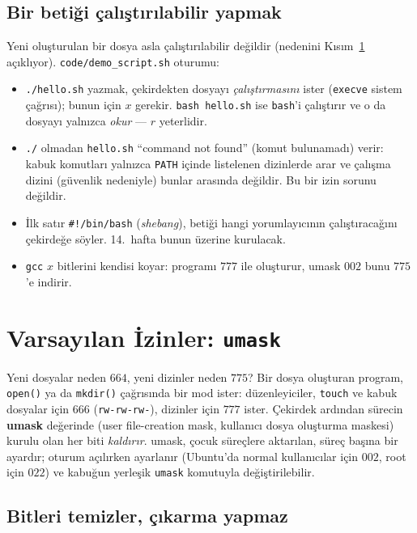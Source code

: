 \documentclass[11pt,a4paper]{article}
\newcommand{\term}[1]{\textbf{\color{mintdeep}#1}}
\newcommand{\cmd}[1]{\texttt{#1}}
\begin{document}
\subsection{Bir betiği çalıştırılabilir yapmak}
\label{sec:script}

Yeni oluşturulan bir dosya asla çalıştırılabilir değildir (nedenini Kısım~\ref{sec:umask} açıklıyor). \cmd{code/demo\_script.sh} oturumu:



\begin{itemize}
  \item \cmd{./hello.sh} yazmak, çekirdekten dosyayı \emph{çalıştırmasını} ister (\cmd{execve} sistem çağrısı); bunun için $x$ gerekir. \cmd{bash hello.sh} ise \cmd{bash}'i çalıştırır ve o da dosyayı yalnızca \emph{okur} --- $r$ yeterlidir.
  \item \texttt{./} olmadan \cmd{hello.sh} ``command not found'' (komut bulunamadı) verir: kabuk komutları yalnızca \texttt{PATH} içinde listelenen dizinlerde arar ve çalışma dizini (güvenlik nedeniyle) bunlar arasında değildir. Bu bir izin sorunu değildir.
  \item İlk satır \texttt{\#!/bin/bash} (\emph{shebang}), betiği hangi yorumlayıcının çalıştıracağını çekirdeğe söyler. 14.~hafta bunun üzerine kurulacak.
  \item \cmd{gcc} $x$ bitlerini kendisi koyar: programı $777$ ile oluşturur, umask $002$ bunu $775$'e indirir.
\end{itemize}

\section{Varsayılan İzinler: \cmd{umask}}
\label{sec:umask}

Yeni dosyalar neden $664$, yeni dizinler neden $775$? Bir dosya oluşturan program, \cmd{open()} ya da \cmd{mkdir()} çağrısında bir mod ister: düzenleyiciler, \cmd{touch} ve kabuk dosyalar için $666$ (\texttt{rw-rw-rw-}), dizinler için $777$ ister. Çekirdek ardından sürecin \term{umask} değerinde (user file-creation mask, kullanıcı dosya oluşturma maskesi) kurulu olan her biti \emph{kaldırır}. umask, çocuk süreçlere aktarılan, süreç başına bir ayardır; oturum açılırken ayarlanır (Ubuntu'da normal kullanıcılar için $002$, root için $022$) ve kabuğun yerleşik \cmd{umask} komutuyla değiştirilebilir.

\subsection{Bitleri temizler, çıkarma yapmaz}
\end{document}
